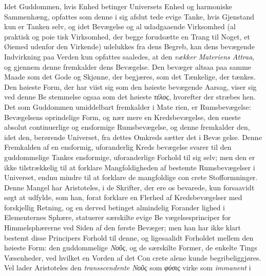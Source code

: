 \documentclass[12pt,a4paper]{book}
\newcommand{\gk}[1]{\textit{#1}}
\begin{document}
Idet Guddommen, hvis Enhed betinger Universets Enhed
og harmoniske Sammenhæng, opfattes som denne i sig afslut\-%
tede evige Tanke, hvis Gjenstand kun er Tanken selv, og idet
Bevægelse og al udadgaaende Virksomhed (al praktisk og poie\-%
tisk Virksomhed, der begge forudsætte en Trang til Noget, et
Øiemed udenfor den Virkende) udelukkes fra dens Begreb, kan
dens bevægende Indvirkning paa Verden kun opfattes saaledes,
at den \emph{vækker Materiens Attraa}, og gjennem denne
fremkalder dens Bevægelse. Den bevæger altsaa paa samme
Maade som det Gode og Skjønne, der begjæres, som det
Tænkelige, der tænkes. Den høieste Form, der har viist sig
som den høieste bevægende Aarsag, viser sig ved denne Be\-%
stemmelse ogsaa som det høieste \gk{τέλος}, hvorefter der stræbes
hen. Det som Guddommen umiddelbart fremkalder i Mate\-%
rien, er Rumsbevægelse: Bevægelsens oprindelige Form, og nær\-%
mere en Kredsbevægelse, den eneste absolut continuerlige og
ensformige Rumsbevægelse, og denne fremkalder den, idet den,
berørende Universet, fra dettes Omkreds sætter det i Bevæ\-%
gelse. Denne Fremkalden af en ensformig, uforanderlig Kreds\-%
bevægelse svarer til den guddommelige Tankes ensformige,
\setcounter{footnote}{0}
uforanderlige Forhold til sig selv; men den er ikke tilstrækkelig
til at forklare Mangfoldigheden af bestemte Rumsbevægelser i
Universet, endnu mindre til at forklare de mangfoldige con\-%
crete Stofformninger. Denne Mangel har Aristoteles, i de
Skrifter, der ere os bevarede, kun forsaavidt søgt at udfylde,
som han, forat forklare en Flerhed af Kredsbevægelser med
forskjellig Retning, og en derved betinget almindelig Forander\-%
lighed i Elementernes Sphære, statuerer særskilte evige Be\-%
vægelsesprinciper for Himmelsphærerne ved Siden af den første
Bevæger; men han har ikke klart bestemt disse Principers
Forhold til denne, og ligesaalidt Forholdet mellem den høieste
Form: den guddommelige \gk{Νοῦς}, og de særskilte Former, de
enkelte Tings Væsenheder, ved hvilket en Vorden af det Con\-%
crete alene kunde begribeliggjøres. Vel lader Aristoteles den
\emph{transscendente} \gk{Νοῦς} som \gk{φύσις} virke som \emph{immanent} i
\end{document}
